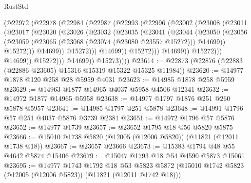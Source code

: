 \begin{lexlean}{RustStd}
\begin{coremodule}
                          (@22972
                            (@22978
                              (@22984
                                (@22987
                                  (@22993
                                    (@22996
                                      (@23002
                                        (@23008
                                          (@23011
                                            (@23017
                                              (@23020
                                                (@23026
                                                  (@23032
                                                    (@23035
                                                      (@23041
                                                        (@23044
                                                          (@23050
                                                            (@23056
                                                              (@23059
                                                                (@23065
                                                                  (@23068
                                                                    (@23074 (@23080 @23557 @15272)))
                                                                  @14699))
                                                              @15272)))
                                                        @14699))
                                                    @15272)))
                                              @14699))
                                          @15272)))
                                    @14699))
                                @15272)))
                          @14699))
                      @15272)))
                @14699))
            @15273))))
@23614 := @22873 (@22876 (@22883 (@22886 @23605) @15316 @15319 @15322 @15325 @11984))
@23620 := @14977 @1878 @120 @258 @28 @5959 @4031
@23623 := @14985 @1878 @258 @5959
@23629 := @14963 @1877 @14965 @4037 @5958 @4506 @12341
@23632 := @14972 @1877 @14965 @5958
@23638 := @14977 @1797 @1876 @251 @260 @5878 @5957
@23641 := @14985 @1797 @251 @5878
@23648 := @14991 @1796 @57 @251 @4037 @5876 @3739 @2381
@23651 := @14972 @1796 @57 @5876
@23652 := @14977 @1739
@23657 := @23652 @1795 @18 @56 @5820 @5875
@23666 := @15010 @1738 @5820 (@12005 (@12006 @5820)) (@11821 (@12011 @1738 @18))
@23667 := @23657 @23666
@23673 := @15383 @1794 @48 @55 @4642 @5874 @15406
@23679 := @15047 @1793 @18 @54 @4590 @5873 @15061
@23695 := @14977
    @1743
    @1792
    @18
    @53
    @5823
    @5872
    (@15010 @1742 @5823 (@12005 (@12006 @5823)) (@11821 (@12011 @1742 @18)))

\end{coremodule}
\end{lexlean}
